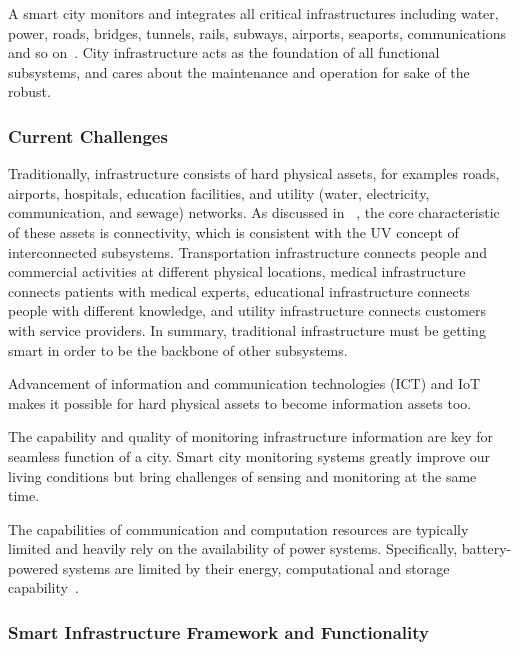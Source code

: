 \documentclass[letterpaper, twocolumn, 10pt, conference]{IEEEtran}
\begin{document}
A smart city monitors and integrates all critical infrastructures including water, power, roads, bridges, tunnels, rails, subways, airports, seaports, communications and so on~\cite{hall2000vision}. City infrastructure acts as the foundation of all functional subsystems, and cares about the maintenance and operation for sake of the robust.  

\subsubsection{Current Challenges}
\label{sssec:zlf:smart_infrastructure:challenges}

Traditionally, infrastructure consists of hard physical assets, for examples roads, airports, hospitals, education facilities, and utility (water, electricity, communication, and sewage) networks. As discussed in ~\cite{mcdonald2018}, the core characteristic of these assets is connectivity, which is consistent with the UV concept of interconnected subsystems. Transportation infrastructure connects people and commercial activities at different physical locations, medical infrastructure connects patients with medical experts, educational infrastructure connects people with different knowledge, and utility infrastructure connects customers with service providers. In summary, traditional infrastructure must be getting smart in order to be the backbone of other subsystems.

Advancement of information and communication technologies (ICT) and IoT makes it possible for hard physical assets to become information assets too. %

The capability and quality of monitoring infrastructure information are key for seamless function of a city. 
Smart city monitoring systems greatly improve our living conditions but bring challenges of sensing and monitoring at the same time. 

The capabilities of communication and computation resources are typically limited and heavily rely on the availability of power systems. Specifically, battery-powered systems are limited by their energy, computational and storage capability~\cite{du2018sensable}.

\subsubsection{Smart Infrastructure Framework and Functionality}
\label{sssec:zlf:smart_infrastructure:framework}
\end{document}
